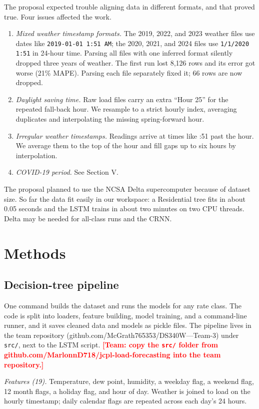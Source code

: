 \documentclass[conference]{IEEEtran}
\newcommand{\todo}[1]{\textcolor{red}{\textbf{[Team: #1]}}}
\newcommand{\code}[1]{\texttt{#1}}
\begin{document}
The proposal expected trouble aligning data in different formats, and that proved true. Four issues affected the work.
\begin{enumerate}[leftmargin=1.6em]
\item \textit{Mixed weather timestamp formats.} The 2019, 2022, and 2023 weather files use dates like \code{2019-01-01 1:51 AM}; the 2020, 2021, and 2024 files use \code{1/1/2020 1:51} in 24-hour time. Parsing all files with one inferred format silently dropped three years of weather. The first run lost 8,126 rows and its error got worse (21\% MAPE). Parsing each file separately fixed it; 66 rows are now dropped.
\item \textit{Daylight saving time.} Raw load files carry an extra ``Hour 25'' for the repeated fall-back hour. We resample to a strict hourly index, averaging duplicates and interpolating the missing spring-forward hour.
\item \textit{Irregular weather timestamps.} Readings arrive at times like :51 past the hour. We average them to the top of the hour and fill gaps up to six hours by interpolation.
\item \textit{COVID-19 period.} See Section V.
\end{enumerate}
The proposal planned to use the NCSA Delta supercomputer because of dataset size. So far the data fit easily in our workspace: a Residential tree fits in about 0.05 seconds and the LSTM trains in about two minutes on two CPU threads. Delta may be needed for all-class runs and the CRNN.

\section{Methods}
\subsection{Decision-tree pipeline}
One command builds the dataset and runs the models for any rate class. The code is split into loaders, feature building, model training, and a command-line runner, and it saves cleaned data and models as pickle files. The pipeline lives in the team repository (github.com/McGrath765353/DS340W---Team-3) under \code{src/}, next to the LSTM script. \todo{copy the \code{src/} folder from github.com/MarlonnD718/jcpl-load-forecasting into the team repository.}

\textit{Features (19).} Temperature, dew point, humidity, a weekday flag, a weekend flag, 12 month flags, a holiday flag, and hour of day. Weather is joined to load on the hourly timestamp; daily calendar flags are repeated across each day's 24 hours.
\end{document}
